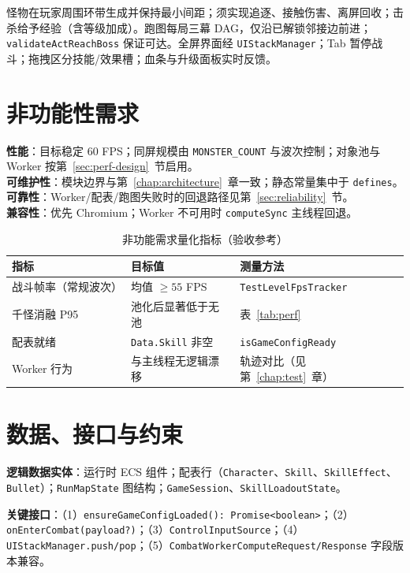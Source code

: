 怪物在玩家周围环带生成并保持最小间距；须实现追逐、接触伤害、离屏回收；击杀给予经验（含等级加成）。跑图每局三幕 DAG，仅沿已解锁邻接边前进；\texttt{validateActReachBoss} 保证可达。全屏界面经 \texttt{UIStackManager}；Tab 暂停战斗；拖拽区分技能/效果槽；血条与升级面板实时反馈\cite{heijstek2011empirical}。

\section{非功能性需求}

\textbf{性能}：目标稳定 60 FPS；同屏规模由 \texttt{MONSTER\_COUNT} 与波次控制；对象池与 Worker 按第~\ref{sec:perf-design}~节启用。\\
\textbf{可维护性}：模块边界与第~\ref{chap:architecture}~章一致；静态常量集中于 \texttt{defines}。\\
\textbf{可靠性}：Worker/配表/跑图失败时的回退路径见第~\ref{sec:reliability}~节。\\
\textbf{兼容性}：优先 Chromium；Worker 不可用时 \texttt{computeSync} 主线程回退\cite{cantrell2018unity}。

\begin{table}[htbp]
  \centering
  \caption{非功能需求量化指标（验收参考）}
  \label{tab:nfr-metrics}
  \begin{tabular}{lll}
    \toprule
    \textbf{指标} & \textbf{目标值} & \textbf{测量方法} \\
    \midrule
    战斗帧率（常规波次） & 均值 $\geq 55$ FPS & \texttt{TestLevelFpsTracker} \\
    千怪消融 P95 & 池化后显著低于无池 & 表~\ref{tab:perf} \\
    配表就绪 & \texttt{Data.Skill} 非空 & \texttt{isGameConfigReady} \\
    Worker 行为 & 与主线程无逻辑漂移 & 轨迹对比（见第~\ref{chap:test}~章） \\
    \bottomrule
  \end{tabular}
\end{table}

\section{数据、接口与约束}

\textbf{逻辑数据实体}：运行时 ECS 组件；配表行（\texttt{Character}、\texttt{Skill}、\texttt{SkillEffect}、\texttt{Bullet}）；\texttt{RunMapState} 图结构；\texttt{GameSession}、\texttt{SkillLoadoutState}。

\textbf{关键接口}：（1）\texttt{ensureGameConfigLoaded(): Promise<boolean>}；（2）\texttt{onEnterCombat(payload?)}；（3）\texttt{ControlInputSource}；（4）\texttt{UIStackManager.push/pop}；（5）\texttt{CombatWorkerComputeRequest/Response} 字段版本兼容。

